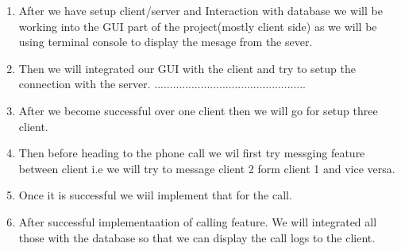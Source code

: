 \documentclass[a4paper]{article}
\begin{document}
{{{\begin{enumerate}
				\item After we have setup client/server and Interaction with database we will be working into the GUI part of the project(mostly client side)  as we will be using terminal console to display the mesage from the sever.


				\item Then we will integrated our GUI with the client and try to setup the connection with the server.
				      .................................................
				\item After we become successful over one client then we will go for setup three client.

				\item Then before heading to the phone call we wil first try messging feature between client i.e we will try to message client 2 form client 1 and vice versa.

				\item Once it is successful we wiil implement that for the call.

				\item After successful implementaation of calling feature. We will integrated all those with the database so that we can display the call logs to the client.
			\end{enumerate}
		}

	}
}
\end{document}

